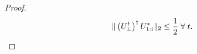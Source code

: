 \documentclass[11pt]{article}
\renewcommand{\eqref}[1]{\hyperref[#1]{(\ref*{#1})}}
\theoremstyle{plain}
\theoremstyle{definition}
\newcommand{\eqdef}{\stackrel{\textrm{def}}{=}}
\newcommand{\frob}[1]{\left\| {#1} \right\|_\text{F}}
\newcommand{\twonorm}[1]{\left\| {#1} \right\|_2}
\newcommand{\Vo}{V^*}
\newcommand{\So}{\Sigma^*}
\newcommand{\Uo}{U^*}
\newcommand{\Vw}{\widehat{V}}
\newcommand{\Uw}{\widehat{U}}
\begin{document}
\begin{proof}
\begin{equation}
  \label{eq:sam_bc_uperp3}
  \|\left(\Up^t\right)^\dag \Uo_{1:i}\|_2\leq \frac{1}{2} \; \forall \;t.
\end{equation}

\end{proof}
\end{document}
